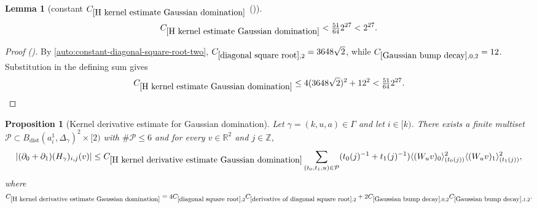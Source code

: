 \documentclass[12pt,reqno]{amsart}
\newcommand{\auto}{{({\tiny\faCar})}}
\theoremstyle{plain}
\newtheorem{lemma}[theorem]{Lemma}
\newtheorem{proposition}[theorem]{Proposition}
\numberwithin{equation}{section}
\theoremstyle{remark}
\newcommand{\using}[1]{}
\newcommand{\Z}{{\mathbb Z}}
\newcommand{\R}{{\mathbb R}}
\begin{document}
\begin{lemma}[constant $C_{\ref{H kernel estimate Gaussian domination}}$ \auto]\label{constant H kernel estimate Gaussian domination}\using{constant diagonal square root}\using{diagonal square root}\using{Gaussian bump decay}\using{H kernel estimate Gaussian domination}
\begin{equation}\label{constant H kernel estimate Gaussian domination bound}
C_{\ref{H kernel estimate Gaussian domination}}
<\tfrac{51}{64}2^{27}<2^{27}.
\end{equation}
\end{lemma}
\begin{proof}[Proof \auto]
By \eqref{auto:constant-diagonal-square-root-two},
$C_{\ref{diagonal square root},2}=3648\sqrt2$, while
$C_{\ref{Gaussian bump decay},0,2}=12$. Substitution in the defining sum gives
\[
C_{\ref{H kernel estimate Gaussian domination}}
\le4(3648\sqrt2)^2+12^2
<\tfrac{51}{64}2^{27}.
\]
\end{proof}


\begin{proposition}[Kernel derivative estimate for Gaussian domination]\label{H kernel derivative estimate Gaussian domination}\using{H kernel estimate Gaussian domination}\using{diagonal square root}\using{derivative of diagonal square root}\using{Gaussian bump decay}
Let $\gamma=(k,u,a)\in \Gamma$ and let $i\in [k)$.
There exists a finite multiset $\mathcal{P}\subset B_{\mathrm{dist}}(a_i^1,\Delta_\gamma)^2\times [2)$ with $\#\mathcal{P}\le 6$ and for every $v\in \R^2$ and $j\in\Z$,
    \begin{equation}\label{auto:H-kernel-derivative-Gaussian-domination}|(\partial_0+\partial_1)(H_\gamma)_{i,j}(v)| \le C_{\ref{H kernel derivative estimate Gaussian domination}} \sum_{(t_0,t_1,u)\in\mathcal{P}} (t_0(j)^{-1} + t_1(j)^{-1}) \langle (W_u v)_0\rangle_{(t_0(j))}^2 \langle (W_u v)_1\rangle_{(t_1(j))}^2, \end{equation}
where $
C_{\ref{H kernel derivative estimate Gaussian domination}}
=
4C_{\ref{diagonal square root},2}
C_{\ref{derivative of diagonal square root},2}
+
2C_{\ref{Gaussian bump decay},0,2}
C_{\ref{Gaussian bump decay},1,2}.
$
\end{proposition}
\end{document}
